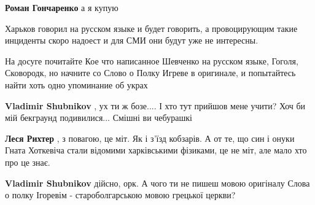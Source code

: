 \begin{itemize}
\begin{itemize}
 
\textbf{Роман Гончаренко} а я купую
\end{itemize}

 

Харьков говорил на русском языке и будет говорить, а провоцирующим такие
инциденты скоро надоест и для СМИ они будут уже не интересны.

На досуге почитайте Кое что написанное Шевченко на русском языке, Гоголя,
Сковородк, но начните со Слово о Полку Игреве в оригинале, и попытайтесь найти
хоть одно упоминание об украх

\begin{itemize}
 
\textbf{Vladimir Shubnikov} , ух ти ж бозе.... І хто тут прийшов мене учити? Хоч би мій бекграунд подивилися... Смішні ви чебурашкі

 
\textbf{Леся Рихтер} , з повагою, це міт. Як і з'їзд кобзарів. А от те, що син
і онуки Гната Хоткевіча стали відомими харківськими фізиками, це не міт, але
мало хто про це знає.

 
\textbf{Vladimir Shubnikov} дійсно, орк. А чого ти не пишеш мовою оригіналу
Слова о полку Ігоревім - староболгарською мовою грецької церкви?


\end{itemize}
\end{itemize}
